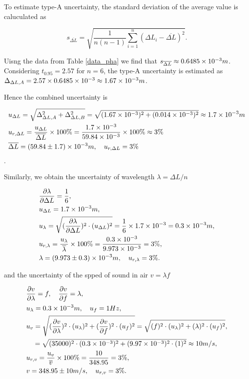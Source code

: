 To estimate type-A uncertainty, the standard deviation of the average value is caluculated as

\[
    s_{\overline{\Delta L}}=\sqrt{\frac{1}{n(n-1)}\sum_{i=1}^n(\Delta
      L_i-\overline{\Delta L})^2}. 
\]

Uisng the data from Table \ref{data_pha} we find that $s_{\overline{\Delta
    L}}\approx 0.6485\times 10^{-3}m$. Considering $t_{0.95}=2.57$ for $n=6$, the
type-A uncertainty is estimated as $\Delta_{\Delta
  L,A}=2.57\times0.6485\times 10^{-3}\approx 1.67\times 10^{-3}m$. 

Hence the combined uncertainty is 

\[
\begin{split}
    &u_{\Delta L}=\sqrt{\Delta_{\Delta L,A}^2+\Delta_{\Delta
        L,B}^2}=\sqrt{(1.67\times 10^{-3})^2+(0.014\times 10^{-3})^2}\approx1.7\times 10^{-3}m\\ 
    &u_{r,\Delta L}=\frac{u_{\Delta L}}{\overline{\Delta L}}\times
    100\%=\frac{1.7\times 10^{-3}}{59.84\times 10^{-3}}\times100\%\approx3\%\\ 
    &\overline{\Delta L}=(59.84\pm 1.7)\times 10^{-3}m,\quad u_{r,\Delta L}=3\% 
\end{split}
\].

Similarly, we obtain the uncertainty of wavelength $\lambda=\Delta L/n$

\[
\begin{split}
    &\frac{\partial \lambda}{\partial \Delta L}=\frac{1}{6},\\ 
    &u_{\Delta L}=1.7\times 10^{-3}m,\\
    &u_{\lambda}=\sqrt{(\frac{\partial \lambda}{\partial \Delta L})^2\cdot
      (u_{\Delta L})^2}=\frac{1}{6}\times 1.7\times 10^{-3}=0.3\times 10^{-3}m,\\ 
    &u_{r,\lambda}=\frac{u_{\lambda}}{\overline{\lambda}}\times
    100\%=\frac{0.3\times 10^{-3}}{9.973\times 10^{-3}}=3\%,\\ 
    &\lambda=(9.973\pm0.3)\times 10^{-3}m,\quad u_{r,\lambda}=3\%. 
\end{split}
\]

and the uncertainty of the spped of sound in air $v=\lambda f$

\[
\begin{split}
    &\frac{\partial v}{\partial \lambda}=f,\quad \frac{\partial v}{\partial 
      f}=\lambda,\\ 
    &u_{\lambda}=0.3\times 10^{-3}m,\quad u_{f}=1Hz,\\
    &u_{v}=\sqrt{(\frac{\partial v}{\partial \lambda})^2\cdot
      (u_{\lambda})^2+(\frac{\partial v}{\partial f})^2\cdot
      (u_{f})^2}=\sqrt{(f)^2\cdot (u_{\lambda})^2+(\lambda)^2\cdot
      (u_{f})^2},\\ 
    &\quad =\sqrt{(35000)^2\cdot(0.3\times 10^{-3})^2+(9.97\times 10^{-3})^2\cdot(1)^2}
    \approx10m/s,\\
    &u_{r,v}=\frac{u_v}{\overline{v}}\times 100\%=\frac{10}{348.95}=3\%,\\
    &v=348.95\pm10 m/s,\quad u_{r,v}=3\%.
\end{split}
\]

